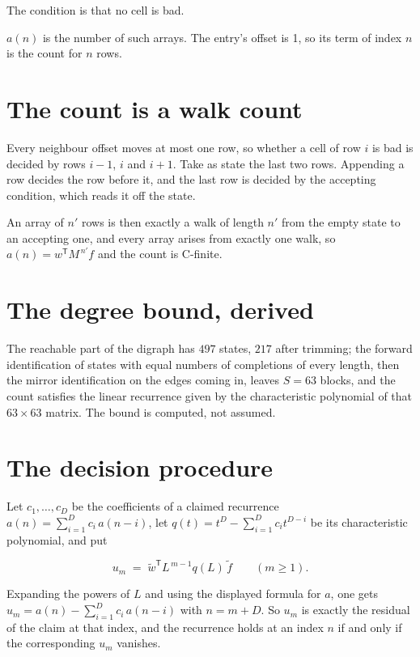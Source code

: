 \documentclass[11pt]{article}
\theoremstyle{definition}
\begin{document}
The condition is that no cell is bad.

$a(n)$ is the number of such arrays. The entry's offset is 1, so its term of index $n$ is the count for $n$ rows.

\section{The count is a walk count}

Every neighbour offset moves at most one row, so whether a cell of row $i$ is bad is decided by rows $i-1$, $i$ and $i+1$. Take as state the last two rows. Appending a row decides the row before it, and the last row is decided by the accepting condition, which reads it off the state.

An array of $n'$ rows is then exactly a walk of length $n'$ from the empty state to an accepting one, and every array arises from exactly one walk, so $a(n) = w^{\mathsf T}M^{\,n'}f$ and the count is C-finite.

\section{The degree bound, derived}

The reachable part of the digraph has $497$ states, $217$ after trimming; the forward identification of states with equal numbers of completions of every length, then the mirror identification on the edges coming in, leaves $S = 63$ blocks, and the count satisfies the linear recurrence given by the characteristic polynomial of that $63\times63$ matrix. The bound is computed, not assumed.

\section{The decision procedure}

Let $c_1,\dots,c_D$ be the coefficients of a claimed recurrence $a(n) = \sum_{i=1}^{D} c_i\,a(n-i)$, let $q(t) = t^{D} - \sum_{i=1}^{D} c_i t^{D-i}$ be its characteristic polynomial, and put

\[u_m \;=\; \tilde w^{\mathsf T} L^{\,m-1} q(L)\,\tilde f \qquad (m \ge 1).\]

Expanding the powers of $L$ and using the displayed formula for $a$, one gets $u_m = a(n) - \sum_{i=1}^{D} c_i\,a(n-i)$ with $n = m + D$. So $u_m$ is exactly the residual of the claim at that index, and the recurrence holds at an index $n$ if and only if the corresponding $u_m$ vanishes.
\end{document}
